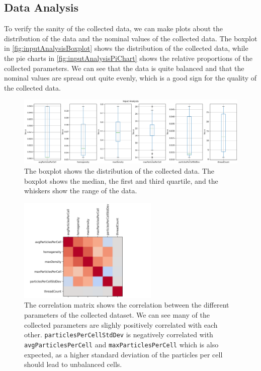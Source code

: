 \subsection{Data Analysis}


To verify the sanity of the collected data, we can make plots about the distribution of the data and the nominal values of the collected data. The boxplot in \autoref{fig:inputAnalysisBoxplot} shows the distribution of the collected data, while the pie charts in \autoref{fig:inputAnalysisPiChart} shows the relative proportions of the collected parameters. We can see that the data is quite balanced and that the nominal values are spread out quite evenly, which is a good sign for the quality of the collected data.


\begin{figure}[H]
    \centering
    \includegraphics[width=\columnwidth,trim={0 0 0 0.5cm},clip]{figures/DataAnalytics/input_analysis.png}
    \caption[Boxplot of the collected Dataset]{The boxplot shows the distribution of the collected data. The boxplot shows the median, the first and third quartile, and the whiskers show the range of the data.}

    \label{fig:inputAnalysisBoxplot}
\end{figure}

\begin{figure}[H]
    \centering
    \includegraphics[height=5cm,trim={0cm 0 2cm 0cm},clip]{figures/DataAnalytics/correlation_matrix.png}
    \caption[Correlation Matrix of the collected Dataset]{The correlation matrix shows the correlation between the different parameters of the collected dataset. We can see many of the collected parameters are slighly positively correlated with each other. \texttt{particlesPerCellStdDev} is negatively correlated with \texttt{avgParticlesPerCell} and \texttt{maxParticlesPerCell} which is also expected, as a higher standard deviation of the particles per cell should lead to unbalanced cells.}
    \label{fig:corrMatrix}
\end{figure}

